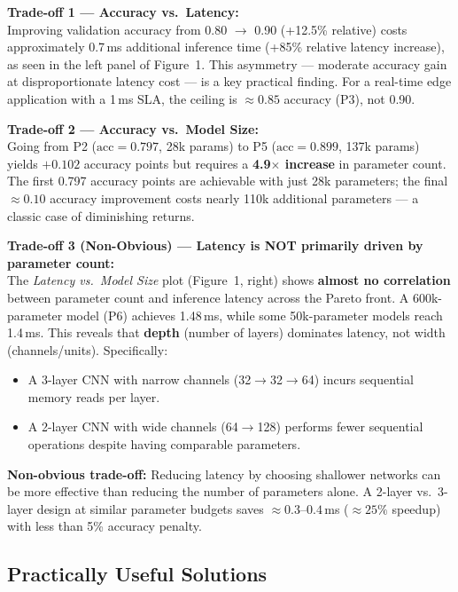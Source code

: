 \documentclass[12pt,a4paper]{article}
\begin{document}
\textbf{Trade-off 1 --- Accuracy vs.\ Latency:}\\
Improving validation accuracy from 0.80 $\to$ 0.90 (+12.5\% relative) costs approximately 0.7\,ms additional inference time (+85\% relative latency increase), as seen in the left panel of Figure~1. This asymmetry --- moderate accuracy gain at disproportionate latency cost --- is a key practical finding. For a real-time edge application with a 1\,ms SLA, the ceiling is $\approx 0.85$ accuracy (P3), not 0.90.

\medskip
\textbf{Trade-off 2 --- Accuracy vs.\ Model Size:}\\
Going from P2 ($\text{acc}=0.797$, 28k params) to P5 ($\text{acc}=0.899$, 137k params) yields $+0.102$ accuracy points but requires a \textbf{4.9$\times$ increase} in parameter count. The first 0.797 accuracy points are achievable with just 28k parameters; the final $\approx 0.10$ accuracy improvement costs nearly 110k additional parameters --- a classic case of diminishing returns.

\medskip
\textbf{Trade-off 3 (Non-Obvious) --- Latency is NOT primarily driven by parameter count:}\\
The \emph{Latency vs.\ Model Size} plot (Figure~1, right) shows \textbf{almost no correlation} between parameter count and inference latency across the Pareto front. A 600k-parameter model (P6) achieves 1.48\,ms, while some 50k-parameter models reach 1.4\,ms. This reveals that \textbf{depth} (number of layers) dominates latency, not width (channels/units). Specifically:
\begin{itemize}
    \item A 3-layer CNN with narrow channels (32$\to$32$\to$64) incurs sequential memory reads per layer.
    \item A 2-layer CNN with wide channels (64$\to$128) performs fewer sequential operations despite having comparable parameters.
\end{itemize}

\noindent\textbf{Non-obvious trade-off:} Reducing latency by choosing shallower networks can be more effective than reducing the number of parameters alone. A 2-layer vs.\ 3-layer design at similar parameter budgets saves $\approx 0.3$--$0.4$\,ms ($\approx 25\%$ speedup) with less than 5\% accuracy penalty.

\subsection{Practically Useful Solutions}
\end{document}

